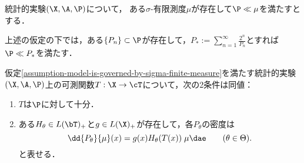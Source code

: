 \documentclass[uplatex,dvipdfmx]{jsreport}
\begin{document}
\begin{assumption}\label{assumption-model-is-governed-by-sigma-finite-measure}
    統計的実験$(\X,\A,\P)$について，
    ある$\sigma$-有限測度$\mu$が存在して$\P\ll\mu$を満たすとする．
\end{assumption}

\begin{lemma}[凸結合による優測度の構成]
    上述の仮定の下では，ある$\{P_n\}\subset\P$が存在して，$P_*:=\sum_{n=1}^\infty\frac{2^n}{P_n}$とすれば$\P\ll P_*$を満たす．
\end{lemma}

\begin{theorem}\label{thm-Fisher-Neyman}
    仮定\ref{assumption-model-is-governed-by-sigma-finite-measure}を満たす統計的実験$(\X,\A,\P)$上の可測関数$T:\X\to\cT$について，次の2条件は同値：
    \begin{enumerate}
        \item $T$は$\P$に対して十分．
        \item ある$H_\theta\in L(\bT)_+$と$g\in L(\X)_+$が存在して，各$P_\theta$の密度は
        \[\dd{P_\theta}{\mu}(x)=g(x)H_\theta(T(x))\;\mu\dae\qquad(\theta\in\Theta).\]
        と表せる．
    \end{enumerate}
\end{theorem}
\end{document}
